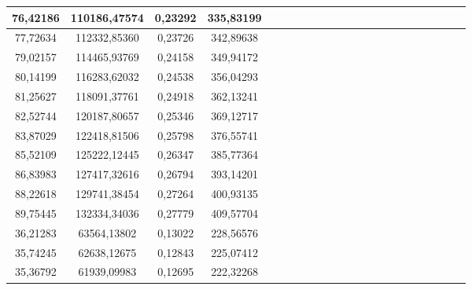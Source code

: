 \documentclass[10pt,a4paper]{article}
\begin{document}
\begin{center}
\begin{center}
\begin{table}[h!]
\begin{tabular}{|c|c|c|c|c|c|c|c|c|c|c|c|c|c|c|c|c|c|c|c|c|c|}
76,42186                    & 110186,47574                  & 0,23292                                      & 335,83199                   \\ \hline
77,72634                    & 112332,85360                  & 0,23726                                      & 342,89638                   \\ \hline
79,02157                    & 114465,93769                  & 0,24158                                      & 349,94172                   \\ \hline
80,14199                    & 116283,62032                  & 0,24538                                      & 356,04293                   \\ \hline
81,25627                    & 118091,37761                  & 0,24918                                      & 362,13241                   \\ \hline
82,52744                    & 120187,80657                  & 0,25346                                      & 369,12717                   \\ \hline
83,87029                    & 122418,81506                  & 0,25798                                      & 376,55741                   \\ \hline
85,52109                    & 125222,12445                  & 0,26347                                      & 385,77364                   \\ \hline
86,83983                    & 127417,32616                  & 0,26794                                      & 393,14201                   \\ \hline
88,22618                    & 129741,38454                  & 0,27264                                      & 400,93135                   \\ \hline
89,75445                    & 132334,34036                  & 0,27779                                      & 409,57704                   \\ \hline
36,21283                    & 63564,13802                   & 0,13022                                      & 228,56576                   \\ \hline
35,74245                    & 62638,12675                   & 0,12843                                      & 225,07412                   \\ \hline
35,36792                    & 61939,09983                   & 0,12695                                      & 222,32268                   \\ \hline

\end{tabular}
\end{table}
\end{center}
\end{center}
\end{document}

